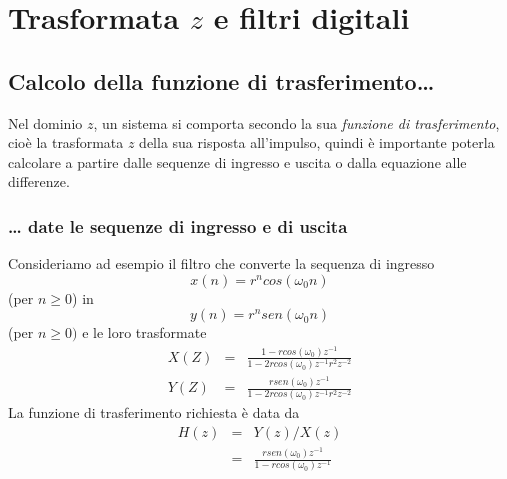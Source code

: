                                                                            
%

\chapter{Trasformata $z$ e filtri digitali}
\section{Calcolo della funzione di trasferimento\ldots}
Nel dominio $z$, un sistema si comporta secondo la sua \emph{funzione di trasferimento}, cio\`e la trasformata $z$ della sua risposta all'impulso, quindi \`e importante poterla calcolare a partire dalle sequenze di ingresso e uscita o dalla equazione alle differenze.
\subsection*{\ldots\textrm{} date le sequenze di ingresso e di uscita}
Consideriamo ad esempio il filtro che converte la sequenza di ingresso
\begin{displaymath}
x(n)=r^n cos(\omega_0 n)
\end{displaymath}
(per $n \geq 0$) in \\
\begin{displaymath}
y(n)=r^n sen(\omega_0 n)
\end{displaymath}
(per $n \geq 0)$ e le loro trasformate \\
\begin{eqnarray*}
X(Z) & = & \frac{1-rcos(\omega_0)z^{-1}}{1-2rcos(\omega_0)z^{-1}r^2 z^{-2}} \\ 
Y(Z) & = & \frac{rsen(\omega_0)z^{-1}}{1-2rcos(\omega_0)z^{-1}r^2 z^{-2}}
\end{eqnarray*}
La funzione di trasferimento richiesta \`e data da 
\begin{eqnarray*}
H(z) & = & Y(z)/X(z) \\
     & = & \frac{rsen(\omega_0)z^{-1}}{1-rcos(\omega_0)z^{-1}}
\end{eqnarray*}
